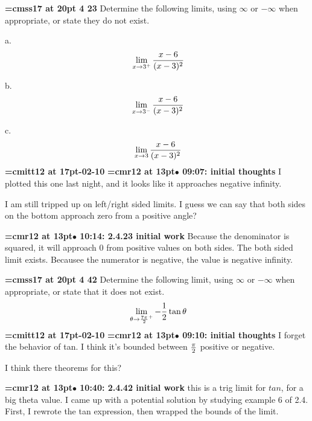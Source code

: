 {\medskip\noindent\bf\font\titlefont=cmss17 at 20pt 4 23}\medskip
Determine the following limits, using $\infty$ or $-\infty$ when
appropriate, or state they do not exist.
\par a. $$\
\lim_{x \to 3^{+}}{
x - 6
\over
(x - 3)^2
}
$$
\par b. $$\
\lim_{x \to 3^{-}}{
x - 6
\over
(x - 3)^2
}
$$
\par c.$$\
\lim_{x \to 3}{
x - 6
\over
(x - 3)^2
}
$$
{\medskip\noindent\bf\font\titlefont=cmitt12 at 17pt-02-10}\medskip
{\smallskip\noindent\bf\font\titlefont=cmr12 at 13pt\titlefont $\bullet$ 09:07: initial thoughts}\smallskip
I plotted this one last night, and it looks like it approaches negative infinity.
\par

I am still tripped up on left/right sided limits. I guess we can say that both sides on the bottom approach zero from a positive angle?
\par

{\smallskip\noindent\bf\font\titlefont=cmr12 at 13pt\titlefont $\bullet$ 10:14: 2.4.23 initial work}\smallskip
Because the denominator is squared, it will approach 0 from positive values on both sides. The both sided limit exists. Becausee the numerator is negative, the value is negative infinity.
\par

\xrdef{node17}
{\medskip\noindent\bf\font\titlefont=cmss17 at 20pt 4 42}\medskip
Determine the following limit, using $\infty$ or $-\infty$
when appropriate, or state that it does not exist.
$$\
\lim_{\theta \to {7\pi \over 2}^{+}}-{
1
\over
2
}\tan \theta
$$
{\medskip\noindent\bf\font\titlefont=cmitt12 at 17pt-02-10}\medskip
{\smallskip\noindent\bf\font\titlefont=cmr12 at 13pt\titlefont $\bullet$ 09:10: initial thoughts}\smallskip
I forget the behavior of tan. I think it's bounded between $\pi \over 2$ positive or negative.
\par

I think there theorems for this?
\par

{\smallskip\noindent\bf\font\titlefont=cmr12 at 13pt\titlefont $\bullet$ 10:40: 2.4.42 initial work}\smallskip
this is a trig limit for $tan$, for a big theta value. I came up with a potential solution by studying example 6 of 2.4. First, I rewrote the tan expression, then wrapped the bounds of the limit.
\par


